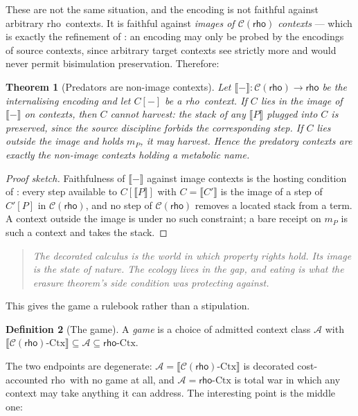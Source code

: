 \documentclass[11pt]{article}
\theoremstyle{plain}
\newtheorem{theorem}{Theorem}
\theoremstyle{definition}
\newtheorem{definition}[theorem]{Definition}
\newcommand{\rhoc}{\textsf{rho}}
\newcommand{\Crho}{\mathcal{C}(\rhoc)}
\newcommand{\enc}[1]{\llbracket #1 \rrbracket}
\begin{document}
These are not the same situation, and the encoding is not faithful against arbitrary \rhoc\ contexts.
It is faithful against \emph{images of $\Crho$ contexts} --- which is exactly the refinement of
\cite{Probing}: an encoding may only be probed by the encodings of source contexts, since arbitrary
target contexts see strictly more and would never permit bisimulation preservation. Therefore:

\begin{theorem}[Predators are non-image contexts]
\label{thm:predator}
Let $\enc{-} : \Crho \to \rhoc$ be the internalising encoding and let $C[-]$ be a \rhoc\ context. If
$C$ lies in the image of $\enc{-}$ on contexts, then $C$ cannot harvest: the stack of any
$\enc{P}$ plugged into $C$ is preserved, since the source discipline forbids the corresponding step.
If $C$ lies outside the image and holds $m_P$, it may harvest. Hence the predatory contexts are
exactly the non-image contexts holding a metabolic name.
\end{theorem}

\begin{proof}[Proof sketch]
Faithfulness of $\enc{-}$ against image contexts is the hosting condition of \cite{Probing}: every
step available to $C[\enc{P}]$ with $C = \enc{C'}$ is the image of a step of $C'[P]$ in $\Crho$, and
no step of $\Crho$ removes a located stack from a term. A context outside the image is under no such
constraint; a bare receipt on $m_P$ is such a context and takes the stack.
\end{proof}

\begin{quote}
\itshape The decorated calculus is the world in which property rights hold. Its image is the state of
nature. The ecology lives in the gap, and eating is what the erasure theorem's side condition was
protecting against.
\end{quote}

This gives the game a rulebook rather than a stipulation.

\begin{definition}[The game]
\label{def:game}
A \emph{game} is a choice of admitted context class $\mathcal{A}$ with
$\enc{\Crho\text{-}\mathrm{Ctx}} \subseteq \mathcal{A} \subseteq \rhoc\text{-}\mathrm{Ctx}$.
\end{definition}

The two endpoints are degenerate: $\mathcal{A} = \enc{\Crho\text{-}\mathrm{Ctx}}$ is decorated
cost-accounted \rhoc\ with no game at all, and $\mathcal{A} = \rhoc\text{-}\mathrm{Ctx}$ is total war
in which any context may take anything it can address. The interesting point is the middle one:
\end{document}
